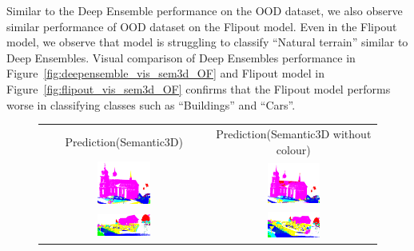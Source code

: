     Similar to the Deep Ensemble performance on the OOD dataset, we also observe similar performance of OOD dataset on the Flipout model.
    Even in the Flipout model, we observe that model is struggling to classify ``Natural terrain'' similar to Deep Ensembles.
    Visual comparison of Deep Ensembles performance in Figure~\ref{fig:deepensemble_vis_sem3d_OF} and Flipout model in Figure~\ref{fig:flipout_vis_sem3d_OF} confirms that the Flipout model performs worse in classifying classes such as ``Buildings'' and ``Cars''.
    \begin{figure}[h!]
        \centering
        \begin{tabular}{cc}
            Prediction(Semantic3D) & Prediction(Semantic3D without colour) \\
            \includegraphics[width=0.33\textwidth, height=0.18\textheight]{images/ood_imgs/fout_sem3d/fout_1.pdf}&
            \includegraphics[width=0.33\textwidth, height=0.18\textheight]{images/sem3d_of/fout_sem3d_of_1.pdf}\\

            \includegraphics[width=0.33\textwidth, height=0.18\textheight]{images/ood_imgs/fout_sem3d/fout_2.pdf}&
            \includegraphics[width=0.33\textwidth, height=0.18\textheight]{images/sem3d_of/fout_sem3d_of_2.pdf}\\


\end{tabular}
\end{figure}
